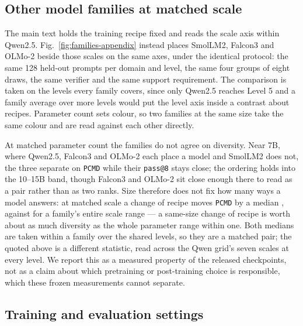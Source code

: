 \documentclass{article}
\newcommand{\1}{\mathbf 1}
\newcommand{\pmd}{\texttt{PCMD}}
\theoremstyle{remark}
\theoremstyle{definition}
\theoremstyle{plain}
\begin{document}
\subsection{Other model families at matched scale}
\label{sec:families-appendix}

The main text holds the training recipe fixed and reads the scale axis within
Qwen2.5. Fig.~\ref{fig:families-appendix} instead places SmolLM2, Falcon3 and
OLMo-2 beside those scales on the same axes, under the identical protocol: the
same 128 held-out prompts per domain and level, the same four groups of eight
draws, the same verifier and the same support requirement. The comparison is
taken on the \MDcommonlevels{} levels every family covers, since only Qwen2.5
reaches Level 5 and a family average over more levels would put the level
axis inside a contrast about recipes. Parameter count sets
colour, so two families at the same size take the same colour and are read
against each other directly.

At matched parameter count the families do not agree on diversity. Near 7B,
where Qwen2.5, Falcon3 and OLMo-2 each place a model and SmolLM2 does not, the
three separate on \pmd{} while their \texttt{pass@8} stays close; the ordering
holds into the 10--15B band, though Falcon3 and OLMo-2 sit close enough there to
read as a pair rather than as two ranks. Size therefore does not fix how
many ways a model answers: at matched scale a change of recipe moves \pmd{} by a
median \MDrecipespan{}, against \MDwithinrecipespan{} for a family's entire
scale range --- a same-size change of recipe is worth about as much diversity as
the whole parameter range within one. Both medians are taken within a family
over the \MDcommonlevels{} shared levels, so they are a matched pair; the
\MDscalespan{} quoted above is a different statistic, read across the Qwen
grid's seven scales at every level. We report this as a measured property
of the released checkpoints, not as a claim about which pretraining or
post-training choice is responsible, which these frozen measurements cannot
separate.


\subsection{Training and evaluation settings}
\label{app:repro-run-contract}
\label{app:comparison-design}
\end{document}
